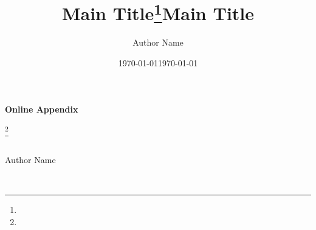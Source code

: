 \documentclass{article}
\title{Main Title\thanks{\blindtext}}
\author{Author Name}
\date{\today}
\begin{document}
\maketitle
\begin{abstract}
\blindtext
\end{abstract}

\newpage

\renewcommand*{\thefootnote}{\fnsymbol{footnote}}
\begin{titlepage}
    \centering
    {\LARGE \textbf{Online Appendix}}\\ [4em]
    {\LARGE \title{Main Title}\footnote[2]{\blindtext}}\\ [1.5em]
    {\large Author Name}\\ [1em]
    {\large \date{\today}}\\ [4em]

\begin{abstract}
    \blindtext
\end{abstract}

\vfill

\end{titlepage}
\end{document}

